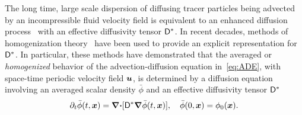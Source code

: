 \documentclass[amsa]{ipart}
\begin{document}
The long time, large scale dispersion of diffusing tracer particles
being advected by an incompressible fluid velocity field is equivalent
to an enhanced diffusion process~\cite{Taylor:PRSL:196} with an
effective diffusivity tensor $\mathsf{D}^*$. In recent decades, methods of
homogenization
theory~\cite{McLaughlin:SIAM_JAM:780,Fannjiang:1994:SIAM_JAM:333,Novikov:2005:CPAM:867,Majda:Kramer:1999:book}
have been used to provide an explicit representation for
$\mathsf{D}^*$. In particular, these methods have demonstrated that the
averaged or \emph{homogenized} behavior of the advection-diffusion
equation in~\eqref{eq:ADE}, with space-time periodic velocity field
$\boldsymbol{u}$, is determined by a diffusion equation
involving an averaged scalar density $\bar{\phi}$ and an
effective diffusivity tensor
$\mathsf{D}^*$~\cite{Majda:Kramer:1999:book}       
%
\begin{align}\label{eq:phi_bar}
 \partial_t\bar{\phi}(t,\vecx)=\bnabla\bcdot[\Dm^*\bnabla \bar{\phi}(t,\vecx)], \quad
  \bar{\phi}(0,\vecx)=\phi_0(\vecx).
\end{align}
\end{document}

